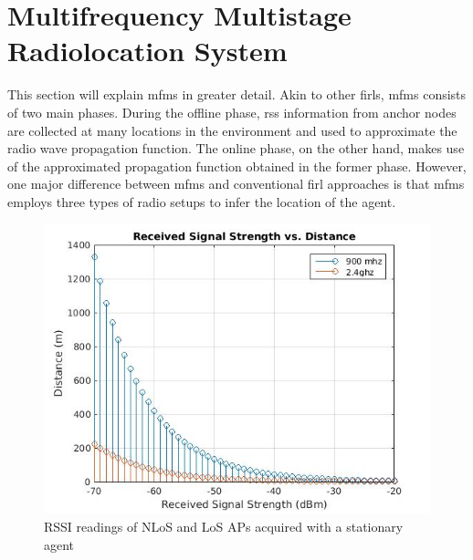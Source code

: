 \section{Multifrequency Multistage Radiolocation System}
\label{sec:mfms}
    This section will explain \gls{mfms} in greater detail.
    Akin to other \gls{firl}s, \gls{mfms} consists of two main phases.
    During the offline phase, \gls{rss} information from anchor nodes are collected at many locations in the environment and used to approximate the radio wave propagation function.
    The online phase, on the other hand, makes use of the approximated propagation function obtained in the former phase.
    However, one major difference between \gls{mfms} and conventional \gls{firl} approaches is that \gls{mfms} employs three types of radio setups to infer the location of the agent.

    \begin{figure}[thpb]
        \centering
        \includegraphics[width=\linewidth]{figures/rss-vs-distance.jpg}
        \caption{\label{fig:log-distance}RSSI readings of NLoS and LoS APs acquired with a stationary agent}
    \end{figure}

